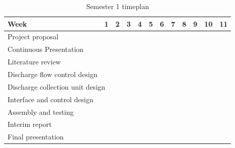 \begin{table}[H]
\centering
\begin{tabular}{|ll|l|l|l|l|l|l|l|l|l|l|}
\hline
\multicolumn{1}{|l|}{\textbf{Week}} & \textbf{1} & \textbf{2} & \textbf{3} & \textbf{4} & \textbf{5} & \textbf{6} & \textbf{7} & \textbf{8} & \textbf{9} & \textbf{10} & \textbf{11} \\ \hline
\multicolumn{1}{|l|}{Project proposal} &  & \cellcolor[HTML]{656565}{\color[HTML]{656565} } & \cellcolor[HTML]{656565}{\color[HTML]{656565} } & \cellcolor[HTML]{656565}{\color[HTML]{656565} } &  &  &  &  &  &  &  \\ \hline
\multicolumn{1}{|l|}{Continuous Presentation} &  &  &  &  & \cellcolor[HTML]{656565} & \cellcolor[HTML]{656565} & \cellcolor[HTML]{656565} & \cellcolor[HTML]{656565} & \cellcolor[HTML]{656565} & \cellcolor[HTML]{656565} & \cellcolor[HTML]{656565} \\ \hline
\multicolumn{1}{|l|}{Literature review} &  &  &  &  &  & \cellcolor[HTML]{656565} & \cellcolor[HTML]{656565} & \cellcolor[HTML]{656565} & \cellcolor[HTML]{656565} & \cellcolor[HTML]{656565} & \cellcolor[HTML]{656565} \\ \hline
\multicolumn{1}{|l|}{Discharge flow control design} &  &  &  &  &  & \cellcolor[HTML]{656565} & \cellcolor[HTML]{656565} & \cellcolor[HTML]{656565} & \cellcolor[HTML]{656565} & \cellcolor[HTML]{656565} &  \\ \hline
\multicolumn{2}{|l|}{Discharge   collection unit design} &  &  &  &  &  & \cellcolor[HTML]{656565} & \cellcolor[HTML]{656565} & \cellcolor[HTML]{656565} & \cellcolor[HTML]{656565} &  \\ \hline
\multicolumn{1}{|l|}{Interface and control design} &  &  &  &  &  &  &  &  & \cellcolor[HTML]{656565} & \cellcolor[HTML]{656565} & \cellcolor[HTML]{656565} \\ \hline
\multicolumn{1}{|l|}{Assembly and testing} &  &  &  &  &  &  & \cellcolor[HTML]{656565} & \cellcolor[HTML]{656565} & \cellcolor[HTML]{656565} & \cellcolor[HTML]{656565} &  \\ \hline
\multicolumn{1}{|l|}{Interim report} &  &  &  &  &  &  &  &  & \cellcolor[HTML]{656565} & \cellcolor[HTML]{656565} & \cellcolor[HTML]{656565} \\ \hline
\multicolumn{1}{|l|}{Final presentation} &  &  &  &  &  &  &  &  &  &  & \cellcolor[HTML]{656565} \\ \hline
\end{tabular}
\caption{Semester 1 timeplan}
\end{table}


